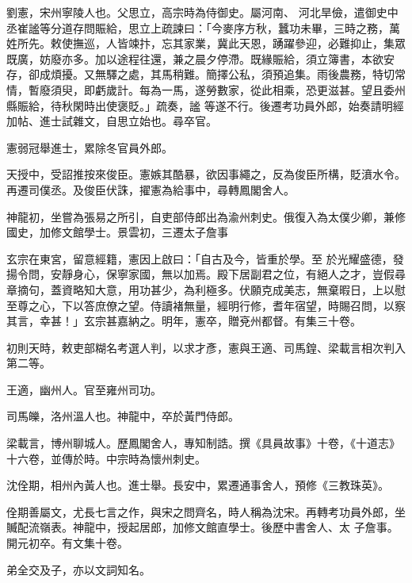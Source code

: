 \begin{pinyinscope}
 劉憲，宋州寧陵人也。父思立，高宗時為侍御史。屬河南、
 河北旱儉，遣御史中丞崔謐等分道存問賑給，思立上疏諫曰：「今麥序方秋，蠶功未畢，三時之務，萬姓所先。敕使撫巡，人皆竦抃，忘其家業，冀此天恩，踴躍參迎，必難抑止，集眾既廣，妨廢亦多。加以途程往還，兼之晨夕停滯。既緣賑給，須立簿書，本欲安存，卻成煩擾。又無驛之處，其馬稍難。簡擇公私，須預追集。雨後農務，特切常情，暫廢須臾，即虧歲計。每為一馬，遂勞數家，從此相乘，恐更滋甚。望且委州縣賑給，待秋閑時出使褒貶。」疏奏，謐
 等遂不行。後遷考功員外郎，始奏請明經加帖、進士試雜文，自思立始也。尋卒官。



 憲弱冠舉進士，累除冬官員外郎。



 天授中，受詔推按來俊臣。憲嫉其酷暴，欲因事繩之，反為俊臣所構，貶濆水令。再遷司僕丞。及俊臣伏誅，擢憲為給事中，尋轉鳳閣舍人。



 神龍初，坐嘗為張易之所引，自吏部侍郎出為渝州刺史。俄復入為太僕少卿，兼修國史，加修文館學士。景雲初，三遷太子詹事



 玄宗在東宮，留意經籍，憲因上啟曰：「自古及今，皆重於學。至
 於光耀盛德，發揚令問，安靜身心，保寧家國，無以加焉。殿下居副君之位，有絕人之才，豈假尋章摘句，蓋資略知大意，用功甚少，為利極多。伏願克成美志，無棄暇日，上以慰至尊之心，下以答庶僚之望。侍讀褚無量，經明行修，耆年宿望，時賜召問，以察其言，幸甚！」玄宗甚嘉納之。明年，憲卒，贈兗州都督。有集三十卷。



 初則天時，敕吏部糊名考選人判，以求才彥，憲與王適、司馬鍠、梁載言相次判入第二等。



 王適，幽州人。官至雍州司功。



 司馬皪，洛州溫人也。神龍中，卒於黃門侍郎。



 梁載言，博州聊城人。歷鳳閣舍人，專知制誥。撰《具員故事》十卷，《十道志》十六卷，並傳於時。中宗時為懷州刺史。



 沈佺期，相州內黃人也。進士舉。長安中，累遷通事舍人，預修《三教珠英》。



 佺期善屬文，尤長七言之作，與宋之問齊名，時人稱為沈宋。再轉考功員外郎，坐贓配流嶺表。神龍中，授起居郎，加修文館直學士。後歷中書舍人、太
 子詹事。開元初卒。有文集十卷。



 弟全交及子，亦以文詞知名。




\end{pinyinscope}
